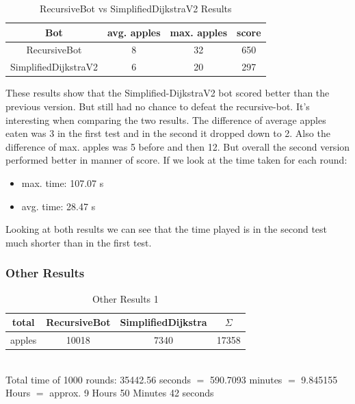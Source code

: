 \documentclass[a4paper,12pt]{article}
\begin{document}
\begin{table}[ht]
\caption{RecursiveBot vs SimplifiedDijkstraV2 Results} %
\centering %
\begin{tabular}{c c c c } %
\hline\hline %
Bot & avg. apples & max. apples & score\\ [0.5ex] %
\hline %
RecursiveBot & 8 & 32 & 650 \\ %
SimplifiedDijkstraV2 & 6 & 20 & 297 \\
[1ex] %
\hline %
\end{tabular}
\label{table:recvsdijkstra2} %
\end{table}
These results show that the Simplified-DijkstraV2 bot scored better than the previous version. But still had no chance to defeat the recursive-bot. It's interesting when comparing the two results. The difference of average apples eaten was 3 in the first test and in the second it dropped down to 2. Also the difference of max. apples was 5 before and then 12. But overall the second version performed better in manner of score.
If we look at the time taken for each round:\\
\begin{itemize}
	\item max. time: 107.07 s
	\item avg. time:  28.47 s
\end{itemize}
Looking at both results we can see that the time played is in the second test much shorter than in the first test.
\newpage
\subsubsection{Other Results}
\begin{table}[H]
\caption{Other Results 1} %
\centering %
\begin{tabular}{c c c c } %
\hline\hline %
total & RecursiveBot &SimplifiedDijkstra & $\Sigma$ \\ [0.5ex] %
\hline %
apples & 10018 & 7340 & 17358 \\ %
[1ex] %
\hline %
\end{tabular}
\label{table:otherresults1} %
\\Total time of 1000 rounds: 35442.56 seconds $=$ 590.7093 minutes $=$ 9.845155 Hours $=$ approx. 9 Hours 50 Minutes 42 seconds
\end{table}
\end{document}
